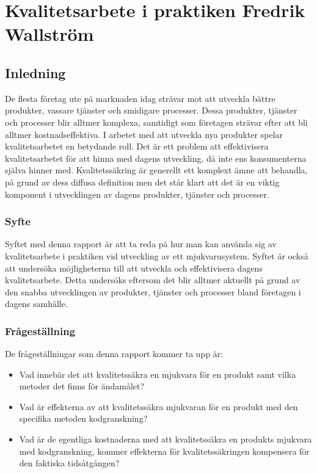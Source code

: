 \chapter{Kvalitetsarbete i praktiken Fredrik Wallström}
\label{cha:indiv-report-wallstrom}

\section{Inledning}
\label{sec:introduction-wallstrom}

De flesta företag ute på marknaden idag strävar mot att utveckla bättre produkter, vassare tjänster och smidigare processer. Dessa produkter, tjänster och processer blir alltmer komplexa, samtidigt som företagen strävar efter att bli alltmer kostnadseffektiva. I arbetet med att utveckla nya produkter spelar kvalitetsarbetet en betydande roll. Det är ett problem att effektivisera kvalitetsarbetet för att hinna med dagens utveckling, då inte ens konsumenterna själva hinner med. Kvalitetssäkring är generellt ett komplext ämne att behandla, på grund av dess diffusa definition men det står klart att det är en viktig komponent i utvecklingen av dagens produkter, tjänster och processer.

\subsection{Syfte}
\label{sec:purpose-wallstrom}

Syftet med denna rapport är att ta reda på hur man kan använda sig av kvalitetsarbete i praktiken vid utveckling av ett mjukvarusystem. Syftet är också att undersöka möjligheterna till att utveckla och effektivisera dagens kvalitetsarbete. Detta undersöks eftersom det blir alltmer aktuellt på grund av den snabba utvecklingen av produkter, tjänster och processer bland företagen i dagens samhälle.

\subsection{Frågeställning}
\label{sec:issue-wallstrom}

De frågeställningar som denna rapport kommer ta upp är:

\begin{itemize}
	\item Vad innebär det att kvalitetssäkra en mjukvara för en produkt samt vilka metoder det finns för ändamålet?
	\item Vad är effekterna av att kvalitetssäkra mjukvaran för en produkt med den specifika metoden kodgranskning?
	\item Vad är de egentliga kostnaderna med att kvalitetssäkra en produkts mjukvara med kodgranskning, kommer effekterna för kvalitetssäkringen kompensera för den faktiska tidsåtgången?
\end{itemize}


